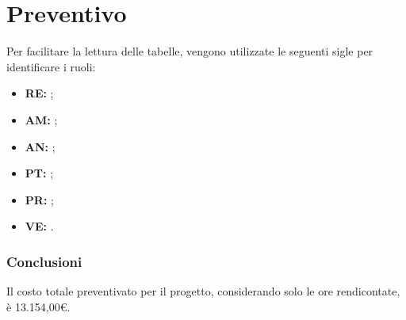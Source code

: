 \section{Preventivo}

Per facilitare la lettura delle tabelle, vengono utilizzate le seguenti sigle per identificare i ruoli:

\begin{itemize}
\item \textbf{RE:} \respProg;
\item \textbf{AM:} \ammProg;
\item \textbf{AN:} \analProg;
\item \textbf{PT:} \progetProg;
\item \textbf{PR:} \programProg;
\item \textbf{VE:} \verifProg.
\end{itemize}


\newpage

\newpage

\newpage

\newpage


\subsubsection{Conclusioni}

Il costo totale preventivato per il progetto, considerando solo le ore rendicontate, è 13.154,00\euro{}.

